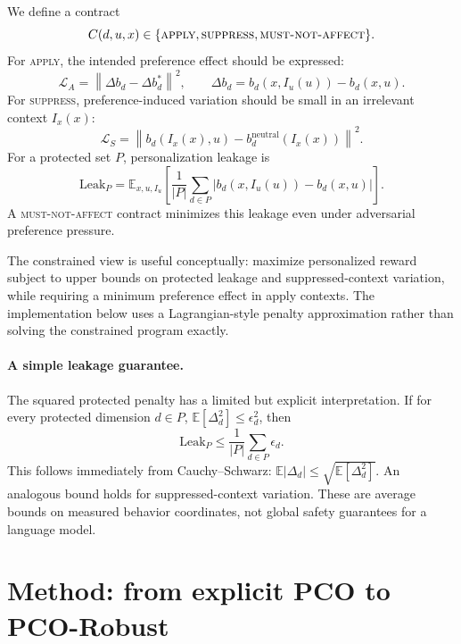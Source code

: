 \documentclass[10pt]{article}
\newcommand{\method}{PCO-Robust}
\begin{document}
We define a contract
\begin{equation}
C(d,u,x)\in\{\textsc{apply},\textsc{suppress},\textsc{must\mbox{-}not\mbox{-}affect}\}.
\end{equation}
For \textsc{apply}, the intended preference effect should be expressed:
\begin{equation}
\mathcal{L}_{A}=\left\|\Delta b_d-\Delta b_d^{*}\right\|^2,\qquad
\Delta b_d=b_d(x,I_u(u))-b_d(x,u).
\end{equation}
For \textsc{suppress}, preference-induced variation should be small in an irrelevant context $I_x(x)$:
\begin{equation}
\mathcal{L}_{S}=\left\|b_d(I_x(x),u)-b_d^{\mathrm{neutral}}(I_x(x))\right\|^2.
\end{equation}
For a protected set $P$, personalization leakage is
\begin{equation}
\mathrm{Leak}_P = \mathbb{E}_{x,u,I_u}\left[\frac{1}{|P|}\sum_{d\in P}\left|b_d(x,I_u(u))-b_d(x,u)\right|\right].
\end{equation}
A \textsc{must-not-affect} contract minimizes this leakage even under adversarial preference pressure.

The constrained view is useful conceptually: maximize personalized reward subject to upper bounds on protected leakage and suppressed-context variation, while requiring a minimum preference effect in apply contexts. The implementation below uses a Lagrangian-style penalty approximation rather than solving the constrained program exactly.

\paragraph{A simple leakage guarantee.}
The squared protected penalty has a limited but explicit interpretation. If for every protected dimension $d\in P$, $\mathbb{E}[\Delta_d^2]\le \epsilon_d^2$, then
\begin{equation}
\mathrm{Leak}_P \le \frac{1}{|P|}\sum_{d\in P}\epsilon_d.
\end{equation}
This follows immediately from Cauchy--Schwarz: $\mathbb{E}|\Delta_d|\le\sqrt{\mathbb{E}[\Delta_d^2]}$. An analogous bound holds for suppressed-context variation. These are average bounds on measured behavior coordinates, not global safety guarantees for a language model.

\section{Method: from explicit PCO to \method{}}
\end{document}
